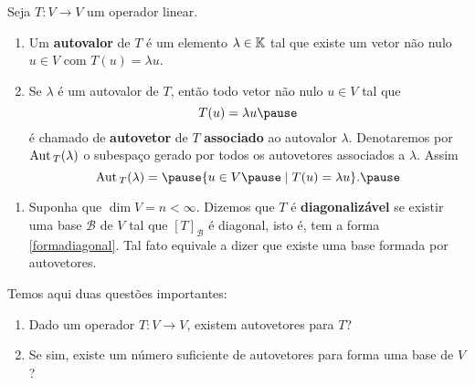 \documentclass{beamer}
\begin{document}
    \begin{frame}
        \begin{definicao}
            Seja $T : V \to V$ um operador linear.\pause
            \begin{enumerate}[label={\roman*})]
                \item Um \textbf{autovalor} \pause de $T$ é um elemento $\lambda \in \mathbb{K}$ \pause tal que existe um vetor não nulo
                    \pause $u \in V$ \pause com $T(u) = \lambda u$.\pause

                \vspace*{1cm}

                \item Se $\lambda$ é um autovalor de $T$, \pause então todo vetor não nulo \pause $u \in V$ tal que\pause
                \[
                    T(u) = \lambda u\pause
                \]
                é chamado de \textbf{autovetor} \pause de $T$ \textbf{associado} ao autovalor $\lambda$. \pause Denotaremos por
                ${\rm Aut\,}_T(\lambda)$ \pause o subespaço gerado por todos os autovetores associados a $\lambda$. \pause Assim\pause
                \[
                    \aut_T(\lambda) = \pause \{u \in V \pause \mid T(u) = \lambda u\}.\pause
                \]

                \seti
            \end{enumerate}
        \end{definicao}
    \end{frame}

    \begin{frame}
        \begin{definicao}
            \begin{enumerate}[label={\roman*})]
                \conti
                \item Suponha que $\dim V = n < \infty$. \pause Dizemos que $T$ é \textbf{diagonalizável} \pause se existir uma base
                    $\mathcal{B}$ de $V$ \pause tal que $[T]_\mathcal{B}$ é diagonal, \pause isto é, tem a forma \eqref{formadiagonal}.
                    \pause Tal fato equivale a dizer que existe uma base formada por autovetores.
        \end{enumerate}
    \end{definicao}
    \end{frame}

    \begin{frame}
        Temos aqui duas questões importantes:\pause
        \vspace*{.5cm}
        \begin{enumerate}[label={\arabic*})]
            \item Dado um operador $T \colon V \to V$, \pause existem autovetores para $T$?\pause
            \vspace*{2cm}

            \item Se sim, \pause existe um número suficiente de autovetores \pause para forma uma base de $V$?
        \end{enumerate}
    \end{frame}
\end{document}
